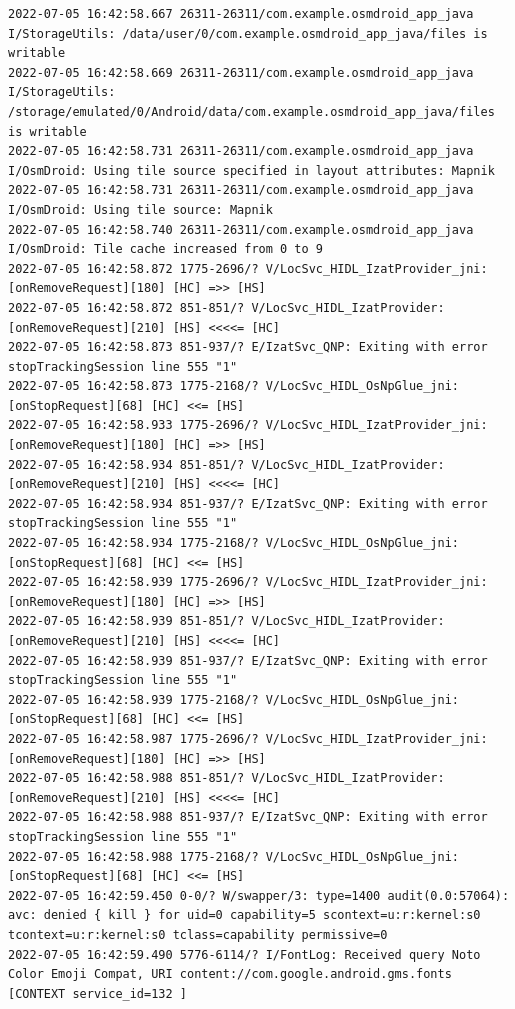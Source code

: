 \documentclass[a4paper,12pt]{book}
\begin{document}
\begin{lstlisting}
2022-07-05 16:42:58.667 26311-26311/com.example.osmdroid_app_java I/StorageUtils: /data/user/0/com.example.osmdroid_app_java/files is writable
2022-07-05 16:42:58.669 26311-26311/com.example.osmdroid_app_java I/StorageUtils: /storage/emulated/0/Android/data/com.example.osmdroid_app_java/files is writable
2022-07-05 16:42:58.731 26311-26311/com.example.osmdroid_app_java I/OsmDroid: Using tile source specified in layout attributes: Mapnik
2022-07-05 16:42:58.731 26311-26311/com.example.osmdroid_app_java I/OsmDroid: Using tile source: Mapnik
2022-07-05 16:42:58.740 26311-26311/com.example.osmdroid_app_java I/OsmDroid: Tile cache increased from 0 to 9
2022-07-05 16:42:58.872 1775-2696/? V/LocSvc_HIDL_IzatProvider_jni: [onRemoveRequest][180] [HC] =>> [HS]
2022-07-05 16:42:58.872 851-851/? V/LocSvc_HIDL_IzatProvider: [onRemoveRequest][210] [HS] <<<<= [HC]
2022-07-05 16:42:58.873 851-937/? E/IzatSvc_QNP: Exiting with error stopTrackingSession line 555 "1"
2022-07-05 16:42:58.873 1775-2168/? V/LocSvc_HIDL_OsNpGlue_jni: [onStopRequest][68] [HC] <<= [HS]
2022-07-05 16:42:58.933 1775-2696/? V/LocSvc_HIDL_IzatProvider_jni: [onRemoveRequest][180] [HC] =>> [HS]
2022-07-05 16:42:58.934 851-851/? V/LocSvc_HIDL_IzatProvider: [onRemoveRequest][210] [HS] <<<<= [HC]
2022-07-05 16:42:58.934 851-937/? E/IzatSvc_QNP: Exiting with error stopTrackingSession line 555 "1"
2022-07-05 16:42:58.934 1775-2168/? V/LocSvc_HIDL_OsNpGlue_jni: [onStopRequest][68] [HC] <<= [HS]
2022-07-05 16:42:58.939 1775-2696/? V/LocSvc_HIDL_IzatProvider_jni: [onRemoveRequest][180] [HC] =>> [HS]
2022-07-05 16:42:58.939 851-851/? V/LocSvc_HIDL_IzatProvider: [onRemoveRequest][210] [HS] <<<<= [HC]
2022-07-05 16:42:58.939 851-937/? E/IzatSvc_QNP: Exiting with error stopTrackingSession line 555 "1"
2022-07-05 16:42:58.939 1775-2168/? V/LocSvc_HIDL_OsNpGlue_jni: [onStopRequest][68] [HC] <<= [HS]
2022-07-05 16:42:58.987 1775-2696/? V/LocSvc_HIDL_IzatProvider_jni: [onRemoveRequest][180] [HC] =>> [HS]
2022-07-05 16:42:58.988 851-851/? V/LocSvc_HIDL_IzatProvider: [onRemoveRequest][210] [HS] <<<<= [HC]
2022-07-05 16:42:58.988 851-937/? E/IzatSvc_QNP: Exiting with error stopTrackingSession line 555 "1"
2022-07-05 16:42:58.988 1775-2168/? V/LocSvc_HIDL_OsNpGlue_jni: [onStopRequest][68] [HC] <<= [HS]
2022-07-05 16:42:59.450 0-0/? W/swapper/3: type=1400 audit(0.0:57064): avc: denied { kill } for uid=0 capability=5 scontext=u:r:kernel:s0 tcontext=u:r:kernel:s0 tclass=capability permissive=0
2022-07-05 16:42:59.490 5776-6114/? I/FontLog: Received query Noto Color Emoji Compat, URI content://com.google.android.gms.fonts [CONTEXT service_id=132 ]

\end{lstlisting}
\end{document}
